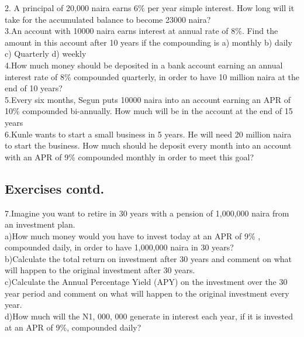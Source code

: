 \documentclass{article}
\begin{document}
		2. A principal of 20,000 naira earns 6\% per year simple interest. How long will it take for the accumulated balance to become 23000 naira?\\
		3.An account with 10000 naira earns interest at annual rate of  8\%. Find the amount in this account after 10 years if the compounding is  a) monthly    b) daily     c) Quarterly   d) weekly\\
		4.How much money should be deposited in a bank account earning an annual interest rate of 8\% compounded quarterly, in order to have 10 million naira at the end of 10 years?
\\
		5.Every six months, Segun puts 10000 naira into an account earning an APR of 10\% compounded bi-annually. How much will be in the account at the end of 15 years\\
		6.Kunle wants to start a small business in 5 years. He will need 20 million naira to start the business. How much should he deposit every month into an account with an APR of 9\% compounded monthly in order to meet this goal?
		\newpage
		\subsection{Exercises contd.}
		7.Imagine you want to retire in 30 years with a pension of 1,000,000 naira from an investment plan. \\ 
		a)How much money would you have to invest today at an APR of 9\% , compounded daily, in order to have 1,000,000 naira in 30 years? \\
		b)Calculate the total return on investment after 30 years and comment on what will happen to the original investment after 30 years.\\
		c)Calculate the Annual Percentage Yield (APY) on the investment over the 30 year period and comment on what will happen to the original investment every year.\\
		d)How much will the N1, 000, 000 generate in interest each year, if it is invested at an APR of 9\%, compounded daily?
		\newpage
\end{document}
